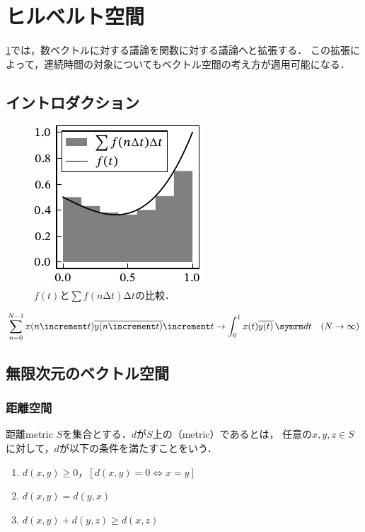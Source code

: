 \documentclass[../../main]{subfiles}
\begin{document}
\chapter{ヒルベルト空間}
\label{chapter:hilbert_space}

\begin{lead}
  \cref{chapter:hilbert_space}では，数ベクトルに対する議論を関数に対する議論へと拡張する．
  この拡張によって，連続時間の対象についてもベクトル空間の考え方が適用可能になる．
\end{lead}

\section{イントロダクション}

\begin{figure}[htbp]
  \centering
  \includegraphics{figures/riemann_sum.pdf}
  \caption{\(f(t)\)と\(\sum f(n\increment t)\increment t\)の比較．}
\end{figure}

\[
  \sum_{n=0}^{N-1}x(n\increment t)\conj*{y(n\increment t)}\increment t \to \int_0^1x(t)\conj*{y(t)}\intd{t}\quad(N\to\infty)
\]

\section{無限次元のベクトル空間}

\subsection{距離空間}

\begin{definition}{距離}{metric}
  \(S\)を集合とする．\(d\)が\(S\)上の（metric）であるとは，
  任意の\(x,y,z\in S\)に対して，\(d\)が以下の条件を満たすことをいう．
  \begin{enumerate}
    \item \(d(x,y)\geq 0\)，\([d(x,y)=0\iff x=y]\)
    \item \(d(x,y)=d(y,x)\)
    \item \(d(x,y)+d(y,z)\geq d(x,z)\)
  \end{enumerate}
\end{definition}
\end{document}
